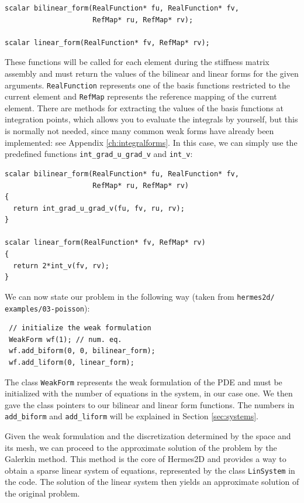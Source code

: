 \begin{lstlisting}
scalar bilinear_form(RealFunction* fu, RealFunction* fv,
                     RefMap* ru, RefMap* rv);

scalar linear_form(RealFunction* fv, RefMap* rv);
\end{lstlisting}

These functions will be called for each element during the stiffness matrix
assembly and must return the values of the bilinear and linear forms for the given arguments.
{\tt RealFunction} represents one of the basis functions restricted to the
current element and {\tt RefMap} represents the reference mapping of the current element.
There are methods for extracting the values of the basis functions at integration points,
which allows you to evaluate the integrals by yourself, but this is normally not needed,
since many common weak forms have already been implemented: see Appendix
\ref{ch:integralforms}. In this case, we can simply use the predefined functions
\verb"int_grad_u_grad_v" and \verb"int_v":

\begin{lstlisting}
scalar bilinear_form(RealFunction* fu, RealFunction* fv,
                     RefMap* ru, RefMap* rv)
{
  return int_grad_u_grad_v(fu, fv, ru, rv);
}

scalar linear_form(RealFunction* fv, RefMap* rv)
{
  return 2*int_v(fv, rv);
}
\end{lstlisting}


We can now state our problem in the following way
(taken from {\tt hermes2d/ examples/03-poisson}):

\begin{lstlisting}
 // initialize the weak formulation
 WeakForm wf(1); // num. eq.
 wf.add_biform(0, 0, bilinear_form);
 wf.add_liform(0, linear_form);
\end{lstlisting}

The class {\tt WeakForm} represents the weak formulation of the PDE and must be
initialized with the number of equations in the system, in our case one. We then
gave the class pointers to our bilinear and linear form functions.
The numbers in {\tt add\_biform} and {\tt add\_liform} will be explained in
Section \ref{sec:systems}.

Given the weak formulation and the discretization determined by the space and its mesh,
we can proceed to the approximate solution of the problem by the Galerkin method.
This method is the core of Hermes2D and provides a way to obtain a sparse linear
system of equations, represented by the class {\tt LinSystem} in the code. The solution
of the linear system then yields an approximate solution of the original problem.


